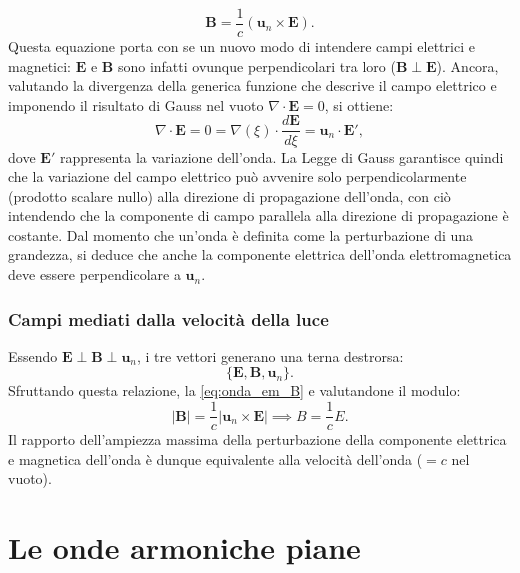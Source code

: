 \documentclass[a4paper,11pt]{report}
\begin{document}
\begin{equation}
\bm{B} = \frac{1}{c} (\bm{u}_n \times \bm{E}).
\label{eq:onda_em_B}
\end{equation}
Questa equazione porta con se un nuovo modo di intendere campi elettrici e magnetici: $\bm{E}$ e $\bm{B}$ sono infatti ovunque perpendicolari tra loro ($\bm{B} \perp \bm{E}$). Ancora, valutando la divergenza della generica funzione che descrive il campo elettrico e imponendo il risultato di Gauss nel vuoto $\nabla \cdot \bm{E} = 0$, si ottiene:
\begin{equation}
\nabla \cdot \bm{E} = 0 = \nabla(\xi) \cdot \frac{d\bm{E}}{d\xi} = \bm{u}_n \cdot \bm{E}',
\end{equation}
dove $\bm{E}'$ rappresenta la variazione dell'onda. La Legge di Gauss garantisce quindi che la variazione del campo elettrico può avvenire solo perpendicolarmente (prodotto scalare nullo) alla direzione di propagazione dell'onda, con ciò intendendo che la componente di campo parallela alla direzione di propagazione è costante. Dal momento che un'onda è definita come la perturbazione di una grandezza, si deduce che anche la componente elettrica dell'onda elettromagnetica deve essere perpendicolare a $\bm{u}_n$. 

\subsubsection{Campi mediati dalla velocità della luce}
Essendo $\bm{E} \perp \bm{B} \perp \bm{u}_n$, i tre vettori generano una terna destrorsa:
\begin{equation}
\{\bm{E}, \bm{B}, \bm{u}_n\}.
\end{equation}
Sfruttando questa relazione, la \eqref{eq:onda_em_B} e valutandone il modulo:
\begin{equation}
|\bm{B}| = \frac{1}{c} |\bm{u}_n \times \bm{E}| \implies B = \frac{1}{c}E.
\end{equation}
Il rapporto dell'ampiezza massima della perturbazione della componente elettrica e magnetica dell'onda è dunque equivalente alla velocità dell'onda ($=c$ nel vuoto).

\section{Le onde armoniche piane}
\end{document}
